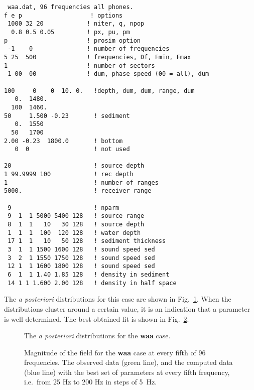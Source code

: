 \documentclass{saclantc}
\begin{document}
\small
\begin{verbatim}
 waa.dat, 96 frequencies all phones.
f e p                   ! options 
 1000 32 20            ! niter, q, npop
  0.8 0.5 0.05         ! px, pu, pm
p                      ! prosim option
 -1    0               ! number of frequencies
5 25  500              ! frequencies, Df, Fmin, Fmax
1                      ! number of sectors
 1 00  00              ! dum, phase speed (00 = all), dum

100     0    0  10. 0.   !depth, dum, dum, range, dum
   0.  1480.     
  100  1460.
50     1.500 -0.23       ! sediment
   0.  1550
  50   1700 
2.00 -0.23  1800.0       ! bottom
   0  0                  ! not used

20                       ! source depth
1 99.9999 100            ! rec depth
1                        ! number of ranges
5000.                    ! receiver range

 9                       ! nparm                 
 9  1  1 5000 5400 128   ! source range         
 8  1  1   10   30 128   ! source depth           
 1  1  1  100  120 128   ! water depth
 17 1  1   10   50 128   ! sediment thickness
 3  1  1 1500 1600 128   ! sound speed sed 
 3  2  1 1550 1750 128   ! sound speed sed 
 12 1  1 1600 1800 128   ! sound speed sed
 6  1  1 1.40 1.85 128   ! density in sediment
 14 1 1 1.600 2.00 128   ! density in half space
\end{verbatim}
\normalsize

The {\it a posteriori} distributions for this case are shown in Fig.\
\ref{fig:waa_ppd}. When the distributions cluster around a
certain value, it is an indication that a parameter is well determined.
%
The best obtained fit is shown in Fig.\ \ref{fig:waa_fit}.

\begin{figure}
\epsfxsize=10cm
\centerline{}
\caption{The {\it a posteriori} distributions for the {\bf waa} case. }
\label{fig:waa_ppd}
\end{figure}


\begin{figure}
\epsfxsize=13cm
\centerline{}
\caption{Magnitude of the field for the {\bf waa} case at every fifth of 96
frequencies. 
The observed data (green line), and the
computed data (blue line) with  the best set of parameters at every
fifth frequency, i.e.\ from 25 Hz to 200 Hz in steps of 5~Hz. 
} 
\label{fig:waa_fit}
\end{figure}
\end{document}
